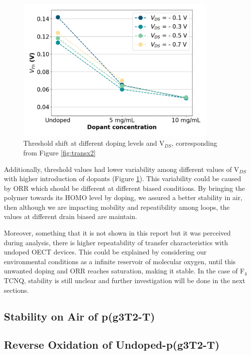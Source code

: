 \begin{figure}[ht]
  \centering
  \includegraphics[width=10cm]{Images/pdf/vth_shift_vds.pdf}
  \caption[Threshold shift at different doping levels and V$_{DS}$]{Threshold shift at different doping levels and V$_{DS}$, corresponding from Figure \ref{fig:transx2}}
  \label{fig:vth_vds}
\end{figure}

Additionally, threshold values had lower variability among different values of V$_{DS}$ with higher introduction of dopants (Figure \ref{fig:vth_vds}). This variability could be caused by ORR which should be different at different biased conditions. By bringing the polymer towards its HOMO level by doping, we assured a better stability in air, then although we are impacting mobility and repeatibility among loops, the values at different drain biased are maintain.

Moreover, something that it is not shown in this report but it was perceived during analysis, there is higher repeatability of transfer characteristics with undoped OECT devices. This could be explained by considering our environmental conditions as a infinite reservoir of molecular oxygen, until this unwanted doping and ORR reaches saturation, making it stable. In the case of F$_{4}$TCNQ, stability is still unclear and further investigation will be done in the next sections.

\subsection{Stability on Air of p(g3T2-T)}

\subsection{Reverse Oxidation of Undoped-p(g3T2-T)}

